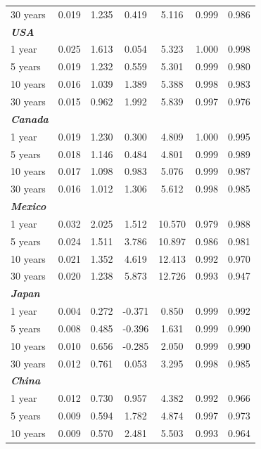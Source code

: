 \documentclass[12pt,bibliography=totoc]{article}
\begin{document}
\begin{appendices}
\begin{table}[H]
\begin{tabular}{l c c c c c c}
30 years	&	0.019	&	1.235	&	0.419	&	5.116	&	0.999	&	0.986	\\
\textbf{\textit{USA}}	&		&		&		&		&		&		\\
1 year	&	0.025	&	1.613	&	0.054	&	5.323	&	1.000	&	0.998	\\
5 years	&	0.019	&	1.232	&	0.559	&	5.301	&	0.999	&	0.980	\\
10 years	&	0.016	&	1.039	&	1.389	&	5.388	&	0.998	&	0.983	\\

30 years	&	0.015	&	0.962	&	1.992	&	5.839	&	0.997	&	0.976	\\
\textbf{\textit{Canada}}	&		&		&		&		&		&		\\
1 year	&	0.019	&	1.230	&	0.300	&	4.809	&	1.000	&	0.995	\\
5 years	&	0.018	&	1.146	&	0.484	&	4.801	&	0.999	&	0.989	\\
10 years	&	0.017	&	1.098	&	0.983	&	5.076	&	0.999	&	0.987	\\
												
30 years	&	0.016	&	1.012	&	1.306	&	5.612	&	0.998	&	0.985	\\
\textbf{\textit{Mexico}}	&		&		&		&		&		&		\\
1 year	&	0.032	&	2.025	&	1.512	&	10.570	&	0.979	&	0.988	\\
5 years	&	0.024	&	1.511	&	3.786	&	10.897	&	0.986	&	0.981	\\
10 years	&	0.021	&	1.352	&	4.619	&	12.413	&	0.992	&	0.970	\\

30 years	&	0.020	&	1.238	&	5.873	&	12.726	&	0.993	&	0.947	\\
\textbf{\textit{Japan}}	&		&		&		&		&		&		\\
1 year	&	0.004	&	0.272	&	-0.371	&	0.850	&	0.999	&	0.992	\\
5 years	&	0.008	&	0.485	&	-0.396	&	1.631	&	0.999	&	0.990	\\
10 years	&	0.010	&	0.656	&	-0.285	&	2.050	&	0.999	&	0.990	\\
												
30 years	&	0.012	&	0.761	&	0.053 	&	3.295	&	0.998	&	0.985	\\
\textbf{\textit{China}}	&		&		&		&		&		&		\\
1 year	&	0.012	&	0.730	&	0.957	&	4.382	&	0.992	&	0.966	\\
5 years	&	0.009	&	0.594	&	1.782	&	4.874	&	0.997	&	0.973	\\
10 years	&	0.009	&	0.570	&	2.481	&	5.503	&	0.993	&	0.964	\\
												

\end{tabular}
\end{table}
\end{appendices}
\end{document}
